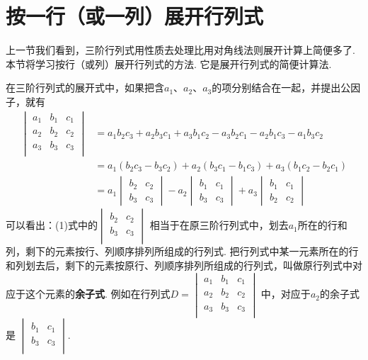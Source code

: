\section{按一行（或一列）展开行列式}
上一节我们看到，三阶行列式用性质去处理比用对角线法则展开计算上简便多了. 本节将学习按行（或列）展开行列式的方法. 它是展开行列式的简便计算法.

在三阶行列式的展开式中，如果把含$a_1$、$a_2$、$a_3$的项分别结合在一起，并提出公因子，就有
\begin{equation}
\begin{split}
  \begin{vmatrix}
    a_1&b_1&c_1\\
    a_2&b_2&c_2\\
    a_3&b_3&c_3\\
  \end{vmatrix}&=a_1b_2c_3+a_2b_3c_1+a_3b_1c_2-a_3b_2c_1-a_2b_1c_3-a_1b_3c_2\\
  &=a_1(b_2c_3-b_3c_2)+a_2(b_3c_1-b_1c_3)+a_3(b_1c_2-b_2c_1)\\
  &=a_1\begin{vmatrix}b_2&c_2\\b_3&c_3\end{vmatrix}-a_2\begin{vmatrix}b_1&c_1\\b_3&c_3\end{vmatrix}+a_3\begin{vmatrix}b_1&c_1\\b_2&c_2\end{vmatrix} 
\end{split}\tag{1}
\end{equation}
可以看出：(1)式中的$\begin{vmatrix}
  b_2&c_2\\
  b_3&c_3\\
\end{vmatrix}$
相当于在原三阶行列式中，划去$a_1$所在的行和列，剩下的元素按行、列顺序排列所组成的行列式. 把行列式中某一元素所在的行和列划去后，剩下的元素按原行、列顺序排列所组成的行列式，叫做原行列式中对应于这个元素的\textbf{余子式}. 例如在行列式$D=\begin{vmatrix}
  a_1&b_1&c_1\\
  a_2&b_2&c_2\\
  a_3&b_3&c_3\\
\end{vmatrix}$
中，对应于$a_2$的余子式是
$\begin{vmatrix}
  b_1&c_1\\
  b_3&c_3\\
\end{vmatrix}$.

